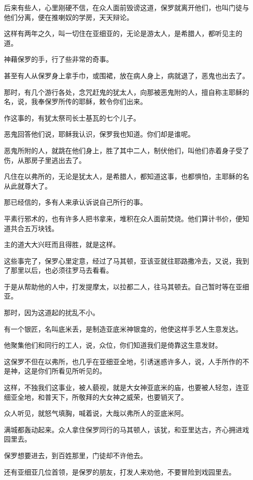 \documentclass[12pt,oneside]{book}
\begin{document}
后来有些人，心里刚硬不信，在众人面前毁谤这道，保罗就离开他们，也叫门徒与他们分离，便在推喇奴的学房，天天辩论。

这样有两年之久，叫一切住在亚细亚的，无论是游太人，是希腊人，都听见主的道。

神藉保罗的手，行了些非常的奇事。

甚至有人从保罗身上拿手巾，或围裙，放在病人身上，病就退了，恶鬼也出去了。

那时，有几个游行各处，念咒赶鬼的犹太人，向那被恶鬼附的人，擅自称主耶稣的名，说，我奉保罗所传的耶稣，敕令你们出来。

作这事的，有犹太祭司长士基瓦的七个儿子。

恶鬼回答他们说，耶稣我认识，保罗我也知道。你们却是谁呢。

恶鬼所附的人，就跳在他们身上，胜了其中二人，制伏他们，叫他们赤着身子受了伤，从那房子里逃出去了。

凡住在以弗所的，无论是犹太人，是希腊人，都知道这事，也都惧怕，主耶稣的名从此就尊大了。

那已经信的，多有人来承认诉说自己所行的事。

平素行邪术的，也有许多人把书拿来，堆积在众人面前焚烧。他们算计书价，便知道共合五万块钱。

主的道大大兴旺而且得胜，就是这样。

这些事完了，保罗心里定意，经过了马其顿，亚该亚就往耶路撒冷去，又说，我到了那里以后，也必须往罗马去看看。

于是从帮助他的人中，打发提摩太，以拉都二人，往马其顿去。自己暂时等在亚细亚。

那时，因为这道起的扰乱不小。

有一个银匠，名叫底米丢，是制造亚底米神银龛的，他使这样手艺人生意发达。

他聚集他们和同行的工人，说，众位，你们知道我们是倚靠这生意发财。

这保罗不但在以弗所，也几乎在亚细亚全地，引诱迷惑许多人，说，人手所作的不是神，这是你们所看见所听见的。

这样，不独我们这事业，被人藐视，就是大女神亚底米的庙，也要被人轻忽，连亚细亚全地，和普天下，所敬拜的大女神之威荣，也要销灭了。

众人听见，就怒气填胸，喊着说，大哉以弗所人的亚底米阿。

满城都轰动起来。众人拿住保罗同行的马其顿人，该犹，和亚里达古，齐心拥进戏园里去。

保罗想要进去，到百姓那里，门徒却不许他去。

还有亚细亚几位首领，是保罗的朋友，打发人来劝他，不要冒险到戏园里去。
\end{document}
